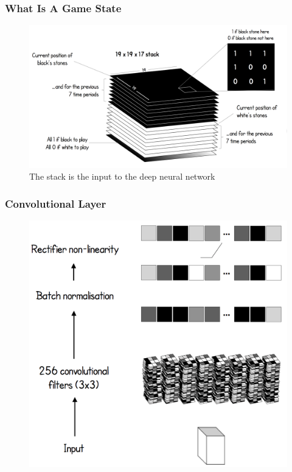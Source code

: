 \documentclass[notheorems, aspectratio=54]{beamer}
\begin{document}
\begin{frame}
    \frametitle{What Is A Game State}

    \begin{figure}
        \includegraphics[width=\textwidth]{fig/game_state.png}
        \caption{The stack is the input to the deep neural network}
    \end{figure}

\end{frame}

\begin{frame}
    \frametitle{Convolutional Layer}

    \begin{figure}
        \includegraphics[height=0.9\textheight]{fig/convolutional_layer.png}
    \end{figure}
\end{frame}
\end{document}
